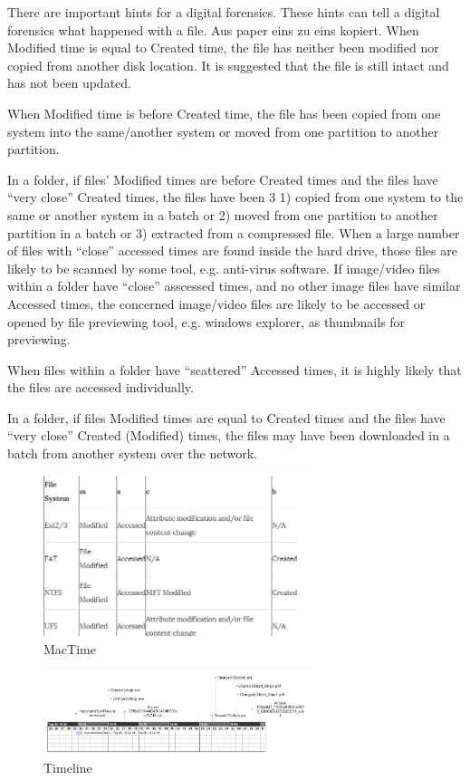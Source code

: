 There are important hints for a digital forensics. These hints can tell a digital forensics what happened with a file. Aus paper eins zu eins kopiert.
When Modified time is equal to Created time, the file has neither been modified nor copied from another disk location. It is suggested that the file is still intact and has not been updated.

When Modified time is before Created time, the file has been copied from one system into the same/another system or moved from one partition to another partition.

In a folder, if files’ Modified times are before Created times and the files have “very close” Created times, the files have been 3
1) copied from one system to the same or another system in a
batch or
2) moved from one partition to another partition in a batch
or
3) extracted from a compressed file.
When a large number of files with “close” accessed times are found inside the hard drive, those files are likely to be scanned by some tool, e.g. anti-virus software.
If image/video files within a folder have “close” asscessed times, and no other image files have similar Accessed times,
the concerned image/video files are likely to be accessed or opened by file previewing tool, e.g. windows explorer, as
thumbnails for previewing.

When files within a folder have “scattered” Accessed times, it is highly likely that the files are accessed individually.

In a folder, if files Modified times are equal to Created times and the files have “very close” Created (Modified) times, the files may have been downloaded in a batch from another system over the network.


\begin{figure}[tbph]
	\centering
	\includegraphics[width=0.7\textwidth]{graphics/mactime}
	\caption{MacTime}
	\label{fig:Mactime}
\end{figure}

\begin{figure}[tbph]
\centering
\includegraphics[width=0.7\textwidth]{graphics/timeline}
\caption{Timeline}
\label{fig:timeline}
\end{figure}
